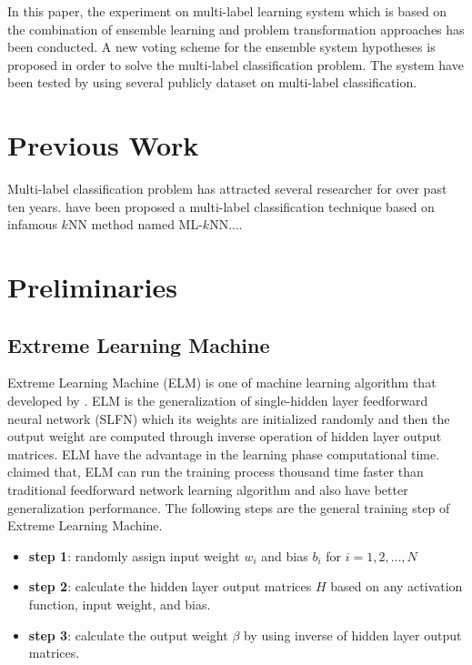 \documentclass{article}
\begin{document}
In this paper, the experiment on multi-label learning system which is based on the combination of ensemble learning and problem transformation approaches has been conducted. A new voting scheme for the ensemble system hypotheses is proposed in order to solve the multi-label classification problem. The system have been tested by using several publicly dataset on multi-label classification.

\section{Previous Work}
\label{related}

Multi-label classification problem has attracted several researcher for over past  ten years. \cite{Zhang2007} have been proposed a multi-label classification technique based on infamous $k$NN method named ML-$k$NN....


\section{Preliminaries}
\label{preliminary}

\subsection{Extreme Learning Machine}
\label{elm}

Extreme Learning Machine (ELM) is one of machine learning algorithm that developed by \cite{Huang2004}. ELM is the generalization of single-hidden layer feedforward neural network (SLFN) which its weights are initialized randomly and then the output weight are computed through inverse operation of hidden layer output matrices. ELM have the advantage in the learning phase computational time. \cite{Huang2004} claimed that, ELM can run the training process thousand time faster than traditional feedforward network learning algorithm and also have better generalization performance. The following steps are the general training step of Extreme Learning Machine.
\begin{itemize}
\item \textbf{step 1}: randomly assign input weight $w_i$ and bias $b_i$ for $i = {1,2,\dots,N}$ 
\item \textbf{step 2}: calculate the hidden layer output matrices $H$ based on any activation function, input weight, and bias. 
\item \textbf{step 3}: calculate the output weight $\beta$ by using inverse of hidden layer output matrices.
\end{itemize}
\end{document}
